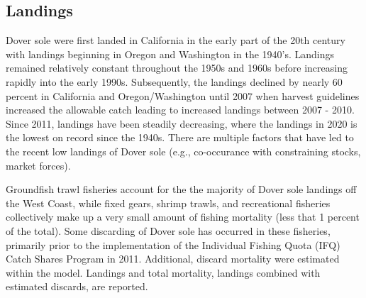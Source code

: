 \documentclass[11pt,
  english,
  a4paper,
]{article}
\begin{document}
\leavevmode\tagmcend\tagstructend\par


\hypertarget{landings}{%
\subsection*{Landings}\label{landings}}

\leavevmode\tagmcend\tagstructend


Dover sole were first landed in California in the early part of the 20th century with landings beginning in Oregon and Washington in the 1940's. Landings remained relatively constant throughout the 1950s and 1960s before increasing rapidly into the early 1990s. Subsequently, the landings declined by nearly 60 percent in California and Oregon/Washington until 2007 when harvest guidelines increased the allowable catch leading to increased landings between 2007 - 2010. Since 2011, landings have been steadily decreasing, where the landings in 2020 is the lowest on record since the 1940s. There are multiple factors that have led to the recent low landings of Dover sole (e.g., co-occurance with constraining stocks, market forces).

\leavevmode\tagmcend\tagstructend\par


Groundfish trawl fisheries account for the the majority of Dover sole landings off the West Coast, while fixed gears, shrimp trawls, and recreational fisheries collectively make up a very small amount of fishing mortality (less that 1 percent of the total). Some discarding of Dover sole has occurred in these fisheries, primarily prior to the implementation of the Individual Fishing Quota (IFQ) Catch Shares Program in 2011. Additional, discard mortality were estimated within the model. Landings and total mortality, landings combined with estimated discards, are reported.

\leavevmode\tagmcend\tagstructend\par

\clearpage



\end{document}
